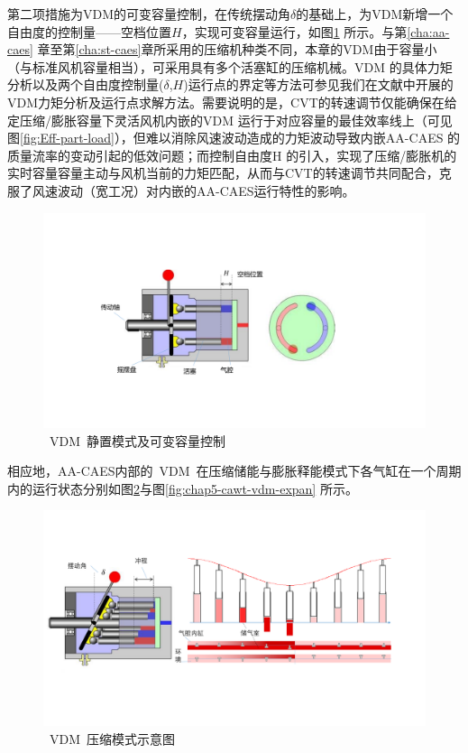 第二项措施为VDM的可变容量控制，在传统摆动角$\delta$的基础上，为VDM新增一个自由度的控制量——空档位置$H$，实现可变容量运行，如图\ref{fig:chap5-cawt-vdm-idle} 所示。与第\ref{cha:aa-caes} 章至第\ref{cha:st-caes}章所采用的压缩机种类不同，本章的VDM由于容量小（与标准风机容量相当），可采用具有多个活塞缸的压缩机械。VDM 的具体力矩分析以及两个自由度控制量($\delta$,$H$)运行点的界定等方法可参见我们在文献中开展的VDM力矩分析及运行点求解方法。需要说明的是，CVT的转速调节仅能确保在给定压缩/膨胀容量下灵活风机内嵌的VDM 运行于对应容量的最佳效率线上（可见图\ref{fig:Eff-part-load}），但难以消除风速波动造成的力矩波动导致内嵌AA-CAES 的质量流率的变动引起的低效问题；而控制自由度H 的引入，实现了压缩/膨胀机的实时容量容量主动与风机当前的力矩匹配，从而与CVT的转速调节共同配合，克服了风速波动（宽工况）对内嵌的AA-CAES运行特性的影响。

\begin{figure}[H] %
  \centering
  \includegraphics[scale=0.45]{figures/Chap5-12-VDM-Idle.pdf}
  \caption{~VDM~静置模式及可变容量控制}
  \label{fig:chap5-cawt-vdm-idle}
\end{figure}

相应地，AA-CAES内部的~VDM~在压缩储能与膨胀释能模式下各气缸在一个周期内的运行状态分别如图\ref{fig:chap5-cawt-vdm-comp}与图\ref{fig:chap5-cawt-vdm-expan} 所示。

\begin{figure}[H] %
  \centering
  \includegraphics[scale=0.45]{figures/Chap5-12-VDM-Comp.pdf}
  \caption{~VDM~压缩模式示意图}
  \label{fig:chap5-cawt-vdm-comp}
\end{figure}

